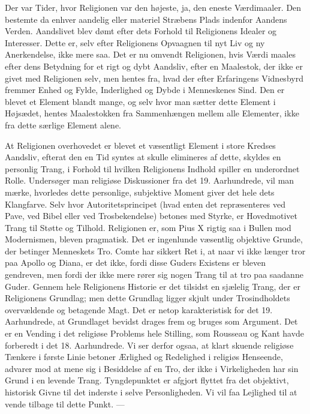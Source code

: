 \documentclass[12pt,a4paper,openany]{book}
\newcommand{\opage}[1]{\marginnote{\footnotesize\textit{[#1]}}}
\begin{document}
Der var Tider, hvor Religionen var den højeste, ja, den eneste
Værdimaaler. Den bestemte da enhver aandelig eller materiel Stræbens
Plads indenfor Aandens Verden. Aandslivet blev dømt efter dets
Forhold til Religionens Idealer og Interesser. Dette er, selv efter Religionens
Opvaagnen til nyt Liv og ny Anerkendelse, ikke mere saa.
Det er nu omvendt Religionen, hvis Værdi maales efter dens Betydning
for et rigt og dybt Aandsliv, efter en Maalestok, der ikke er
\opage{123}givet med Religionen selv, men hentes fra, hvad der efter Erfaringens
Vidnesbyrd fremmer Enhed og Fylde, Inderlighed og Dybde i Menneskenes
Sind. Den er blevet et Element blandt mange, og selv hvor
man sætter dette Element i Højsædet, hentes Maalestokken fra Sammenhængen
mellem alle Elementer, ikke fra dette særlige Element
alene.

At Religionen overhovedet er blevet et væsentligt Element i store
Kredses Aandsliv, efterat den en Tid syntes at skulle elimineres af
dette, skyldes en personlig Trang, i Forhold til hvilken Religionens
Indhold spiller en underordnet Rolle. Undersøger man religiøse Diskussioner
fra det 19. Aarhundrede, vil man mærke, hvorledes dette
personlige, subjektive Moment giver det hele dets Klangfarve. Selv
hvor Autoritetsprincipet (hvad enten det repræsenteres ved Pave,
ved Bibel eller ved Trosbekendelse) betones med Styrke, er Hovedmotivet
Trang til Støtte og Tilhold. Religionen er, som Pius X rigtig
saa i Bullen mod Modernismen, bleven pragmatisk. Det er ingenlunde
væsentlig objektive Grunde, der betinger Menneskets Tro. Comte har
sikkert Ret i, at naar vi ikke længer tror paa Apollo og Diana, er det
ikke, fordi disse Guders Existens er bleven gendreven, men fordi der
ikke mere rører sig nogen Trang til at tro paa saadanne Guder. Gennem
hele Religionens Historie er det tilsidst en sjælelig Trang, der
er Religionens Grundlag; men dette Grundlag ligger skjult under
Trosindholdets overvældende og betagende Magt. Det er netop karakteristisk
for det 19. Aarhundrede, at Grundlaget bevidst drages frem
og bruges som Argument. Det er en Vending i det religiøse Problems
hele Stilling, som Rousseau og Kant havde forberedt i det 18. Aarhundrede.
Vi ser derfor ogsaa, at klart skuende religiøse Tænkere i
første Linie betoner Ærlighed og Redelighed i religiøs Henseende,
advarer mod at mene sig i Besiddelse af en Tro, der ikke i Virkeligheden
har sin Grund i en levende Trang. Tyngdepunktet er afgjort
flyttet fra det objektivt, historisk Givne til det inderste i selve
Personligheden. Vi vil faa Lejlighed til at vende tilbage til dette
Punkt. ---
\end{document}
